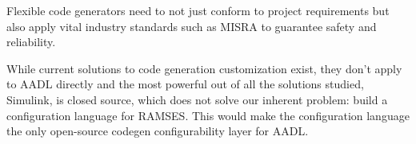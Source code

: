 \begin{tcolorbox}[colback=blue!5, colframe=blue!40!black] Flexible code generators need to not just conform to project requirements but also apply vital industry standards such as \gls{MISRA} to guarantee safety and reliability. \end{tcolorbox}


While current solutions to code generation customization exist, they don't apply to \gls{AADL} directly and the most powerful out of all the solutions studied, Simulink, is closed source, which does not solve our inherent problem: build a configuration language for \gls{RAMSES}. This would make the configuration language the only open-source codegen configurability layer for \gls{AADL}.





